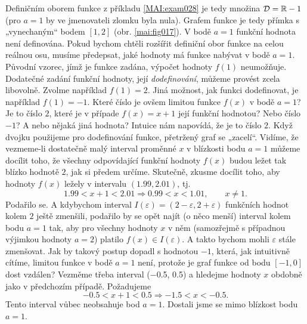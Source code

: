     Definičním oborem funkce z příkladu \ref{MAI:exam028} je tedy množina \(\mathcal{D} = \mathbb{R} -
    {1}\) (pro \(a = 1\) by ve jmenovateli zlomku byla nula). Grafem funkce je tedy přímka s
    „vynechaným“ bodem \([1, 2]\) (obr. \ref{mai:fig017}). V bodě \(a = 1\) funkční hodnota není
    definována. Pokud bychom chtěli rozšířit definiční obor funkce na celou reálnou osu, musíme
    předepsat, jaké hodnoty má funkce nabývat v bodě \(a = 1\). Původní vzorec, jímž je funkce
    zadána, výpočet hodnoty \(f(1)\) neumožňuje. Dodatečné zadání funkční hodnoty, její
    \emph{dodefinování}, můžeme provést zcela libovolně. Zvolme například \(f(1) = 2\). Jiná
    možnost, jak funkci dodefinovat, je například \(f(1) =-1\). Které číslo je ovšem limitou funkce
    \(f(x)\) v bodě \(a = 1\)? Je to číslo \(2\), které je v případe \(f(x) = x+1\) její funkční
    hodnotou? Nebo číslo \(-1\)? A nebo nějaká jiná hodnota? Intuice nám napovídá, že je to číslo
    \(2\). Když dvojku použijeme pro dodefinování funkce, přetržený graf se „zacelí“. Vidíme, že
    vezmeme-li dostatečně malý interval proměnné \(x\) v blízkosti bodu \(a=1\) můžeme docílit toho,
    že všechny odpovídající funkční hodnoty \(f(x)\) budou ležet tak blízko hodnotě \(2\), jak si
    předem určíme. Skutečně, zkusme docílit toho, aby hodnoty \(f(x)\) ležely v intervalu
    \((\num{1.99}, \num{2.01})\), tj.
    \begin{equation*}
      \num{1.99} < x + 1 < \num{2.01} \Rightarrow \num{0.99} < x < \num{1.01},\qquad x\neq1.
    \end{equation*}
    Podařilo se. A kdybychom interval \(I(\varepsilon) = (2 - \varepsilon, 2 + \varepsilon)\) 
    funkčních hodnot kolem \(2\) ještě zmenšili, podařilo by se opět najít (o něco menší) interval 
    kolem bodu \(a = 1\) tak, aby pro všechny hodnoty \(x\) v něm (samozřejmě s případnou výjimkou 
    hodnoty \(a =2\)) platilo \(f(x)\in I(\varepsilon)\). A takto bychom mohli \(\varepsilon\) 
    stále zmenšovat. Jak by takový postup dopadl s hodnotou \(-1\), která, jak intuitivně cítíme, 
    limitou funkce v bodě \(a = 1\) není, protože je graf funkce od bodu \([-1,0]\) dost vzdálen? 
    Vezměme třeba interval (\num{-0.5}, \num{0.5}) a hledejme hodnoty \(x\) obdobně jako v 
    předchozím případě. Požadujeme
    \begin{equation*}
      \num{-0.5} < x + 1 < \num{0.5} \Rightarrow \num{-1.5} < x < \num{-0.5}.
    \end{equation*}
    Tento interval vůbec neobsahuje bod \(a = 1\). Dostali jsme se mimo blízkost bodu \(a = 1\).

